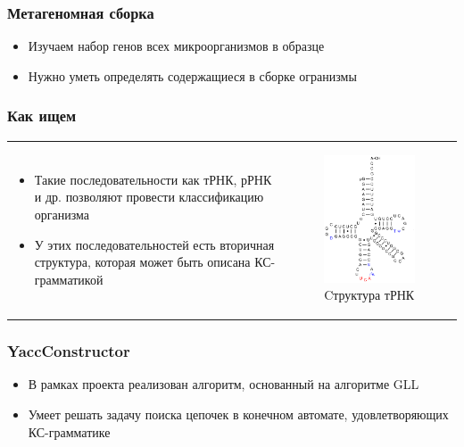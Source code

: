 \documentclass{beamer}
\begin{document}
    \begin{frame}
        \frametitle{Метагеномная сборка}
        \begin{itemize}
            \item Изучаем набор генов всех микроорганизмов в образце
            \item Нужно уметь определять содержащиеся в сборке огранизмы
        \end{itemize}
    \end{frame}
    
    \begin{frame}
        \frametitle{Как ищем}
        \begin{tabular}{p{6cm} p{5cm}}
            \begin{itemize}
                \item Такие последовательности как тРНК, рРНК и др. позволяют провести классификацию организма
                \item У этих последовательностей есть вторичная структура, которая может быть описана КС-грамматикой
            \end{itemize}
            &
            \vspace{-1cm}
            \begin{figure}[b]
                \centering
                \includegraphics[width=5.2cm]{pictures/TRNA.png}
                \caption{Cтруктура тРНК}
            \end{figure}
        \end{tabular}  
    \end{frame}

\begin{frame}
	\frametitle{YaccConstructor}
	\begin{itemize}
		\item В рамках проекта реализован алгоритм, основанный на алгоритме GLL
		\item Умеет решать задачу поиска цепочек в конечном автомате, удовлетворяющих КС-грамматике
	\end{itemize}
\end{frame}
\end{document}
